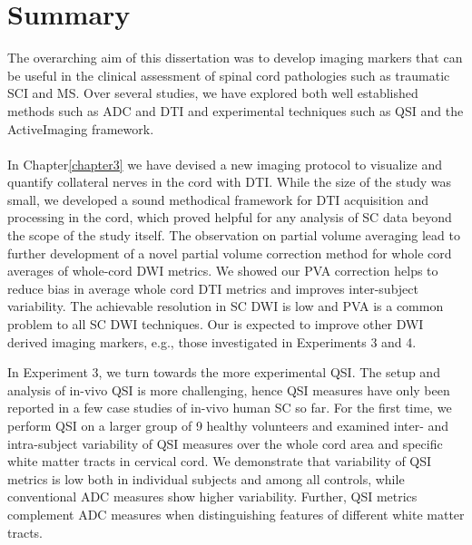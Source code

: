 \section{Summary}
The overarching aim of this dissertation was to develop imaging markers that can be useful in the clinical assessment of spinal cord pathologies such as traumatic \gls{SCI} and \gls{MS}. Over several studies, we have explored both well established methods such as \gls{ADC} and \gls{DTI} and experimental techniques such as \gls{QSI} and the ActiveImaging framework.
\paragraph{}
In Chapter\ref{chapter3} we have devised a new imaging protocol to visualize and quantify collateral nerves in the cord with \gls{DTI}. While the size of the study was small, we developed a sound methodical framework for \gls{DTI} acquisition and processing in the cord, which proved helpful for any analysis of \gls{SC} data beyond the scope of the study itself. The observation on partial volume averaging lead to further development of a novel partial volume correction method for whole cord averages of whole-cord {\gls{DWI}} metrics. We showed our PVA correction helps to reduce bias in average whole cord \gls{DTI} metrics and improves inter-subject variability. The achievable resolution in {\gls{SC}} DWI is low and PVA is a common problem to all {\gls{SC}} DWI techniques. Our is expected to improve other DWI derived imaging markers, e.g., those investigated in Experiments 3 and 4.


In Experiment 3, we turn towards the more experimental \gls{QSI}. The setup and analysis of in-vivo \gls{QSI} is more challenging, hence \gls{QSI} measures have only been reported in a few case studies of in-vivo human {\gls{SC}} so far. For the first time, we perform \gls{QSI} on a larger group of 9 healthy volunteers and examined inter- and intra-subject variability of \gls{QSI} measures over the whole cord area and specific white matter tracts in cervical cord. We demonstrate that variability of \gls{QSI} metrics is low both in individual subjects and among all controls, while conventional \gls{ADC} measures show higher variability. Further, \gls{QSI} metrics complement \gls{ADC} measures when distinguishing features of different white matter tracts.


